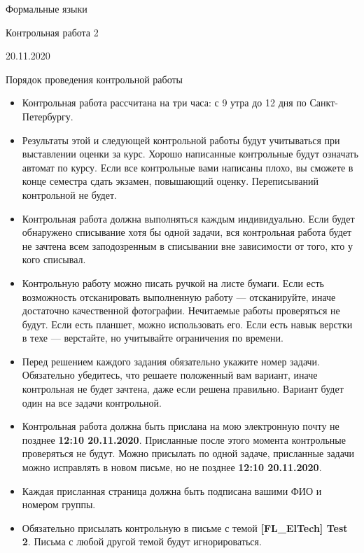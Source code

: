 \documentclass[12pt]{article}
\begin{document}
\begin{center}
{\LARGE Формальные языки}

{\Large Контрольная работа 2}

{\large 20.11.2020}
\end{center}

\bigskip

\begin{center}
  \LARGE Порядок проведения контрольной работы
\end{center}

\begin{itemize}
  \item Контрольная работа рассчитана на три часа: с 9 утра до 12 дня по Санкт-Петербургу.
  \item Результаты этой и следующей контрольной работы будут учитываться при выставлении оценки за курс. Хорошо написанные контрольные будут означать автомат по курсу. Если все контрольные вами написаны плохо, вы сможете в конце семестра сдать экзамен, повышающий оценку. Переписываний контрольной не будет.
  \item Контрольная работа должна выполняться каждым индивидуально. Если будет обнаружено списывание хотя бы одной задачи, вся контрольная работа будет не зачтена всем заподозренным в списывании вне зависимости от того, кто у кого списывал.
  \item Контрольную работу можно писать ручкой на листе бумаги. Если есть возможность отсканировать выполненную работу --- отсканируйте, иначе достаточно качественной фотографии. Нечитаемые работы проверяться не будут. Если есть планшет, можно использовать его. Если есть навык верстки в техе --- верстайте, но учитывайте ограничения по времени.
  \item Перед решением каждого задания обязательно укажите номер задачи. Обязательно убедитесь, что решаете положенный вам вариант, иначе контрольная не будет зачтена, даже если решена правильно. Вариант будет один на все задачи контрольной.
  \item Контрольная работа должна быть прислана на мою электронную почту не позднее \textbf{12:10 20.11.2020}. Присланные после этого момента контрольные проверяться не будут. Можно присылать по одной задаче, присланные задачи можно исправлять в новом письме, но не позднее  \textbf{12:10 20.11.2020}.
  \item Каждая присланная страница должна быть подписана вашими ФИО и номером группы.
  \item Обязательно присылать контрольную в письме с темой \textbf{[FL\_ElTech] Test 2}. Письма с любой другой темой будут игнорироваться.

\end{itemize}
\end{document}
